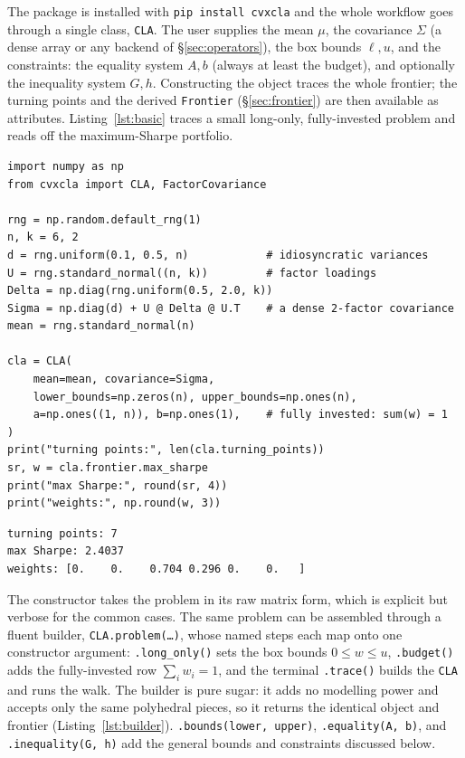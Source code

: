 \documentclass[11pt]{article}
\newcommand{\Sig}{\Sigma}
\newcommand{\lb}{\ell}              %
\newcommand{\ub}{u}                 %
\begin{document}
The package is installed with \texttt{pip install cvxcla} and the whole workflow
goes through a single class, \texttt{CLA}. The user supplies the mean $\mu$, the
covariance $\Sig$ (a dense array or any backend of \S\ref{sec:operators}), the box
bounds $\lb,\ub$, and the constraints: the equality system $A,b$ (always at least
the budget), and optionally the inequality system $G,h$. Constructing the object
traces the whole frontier; the turning points and the derived \texttt{Frontier}
(\S\ref{sec:frontier}) are then available as attributes. Listing~\ref{lst:basic}
traces a small long-only, fully-invested problem and reads off the maximum-Sharpe
portfolio.

\begin{lstlisting}[style=pyin,caption={Tracing a frontier and reading the
maximum-Sharpe portfolio.},label={lst:basic}]
import numpy as np
from cvxcla import CLA, FactorCovariance

rng = np.random.default_rng(1)
n, k = 6, 2
d = rng.uniform(0.1, 0.5, n)            # idiosyncratic variances
U = rng.standard_normal((n, k))         # factor loadings
Delta = np.diag(rng.uniform(0.5, 2.0, k))
Sigma = np.diag(d) + U @ Delta @ U.T    # a dense 2-factor covariance
mean = rng.standard_normal(n)

cla = CLA(
    mean=mean, covariance=Sigma,
    lower_bounds=np.zeros(n), upper_bounds=np.ones(n),
    a=np.ones((1, n)), b=np.ones(1),    # fully invested: sum(w) = 1
)
print("turning points:", len(cla.turning_points))
sr, w = cla.frontier.max_sharpe
print("max Sharpe:", round(sr, 4))
print("weights:", np.round(w, 3))
\end{lstlisting}

\begin{lstlisting}[style=pyout]
turning points: 7
max Sharpe: 2.4037
weights: [0.    0.    0.704 0.296 0.    0.   ]
\end{lstlisting}

The constructor takes the problem in its raw matrix form, which is explicit but
verbose for the common cases. The same problem can be assembled through a fluent
builder, \texttt{CLA.problem(\ldots)}, whose named steps each map onto one
constructor argument: \texttt{.long\_only()} sets the box bounds $0\le w\le\ub$,
\texttt{.budget()} adds the fully-invested row $\sum_i w_i = 1$, and the terminal
\texttt{.trace()} builds the \texttt{CLA} and runs the walk. The builder is pure
sugar: it adds no modelling power and accepts only the same polyhedral pieces, so
it returns the identical object and frontier (Listing~\ref{lst:builder}).
\texttt{.bounds(lower, upper)}, \texttt{.equality(A, b)}, and
\texttt{.inequality(G, h)} add the general bounds and constraints discussed below.
\end{document}
